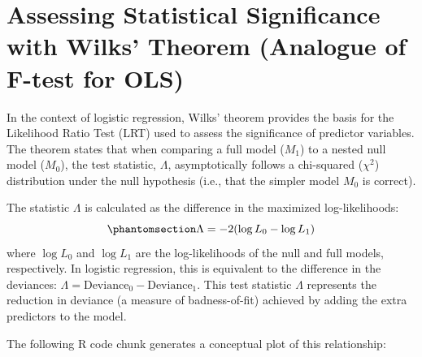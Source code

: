 \documentclass[
  letterpaper,
]{scrbook}
\begin{document}
\section{Assessing Statistical Significance with Wilks' Theorem
(Analogue of F-test for
OLS)}\label{assessing-statistical-significance-with-wilks-theorem-analogue-of-f-test-for-ols}

In the context of logistic regression, Wilks' theorem provides the basis
for the Likelihood Ratio Test (LRT) used to assess the significance of
predictor variables. The theorem states that when comparing a full model
(\(M_1\)) to a nested null model (\(M_0\)), the test statistic,
\(\Lambda\), asymptotically follows a chi-squared (\(\chi^2\))
distribution under the null hypothesis (i.e., that the simpler model
\(M_0\) is correct).

The statistic \(\Lambda\) is calculated as the difference in the
maximized log-likelihoods:
\begin{equation}\phantomsection\label{eq-LRT}{\Lambda = -2(\log L_0 - \log L_1)}\end{equation}
where \(\log L_0\) and \(\log L_1\) are the log-likelihoods of the null
and full models, respectively. In logistic regression, this is
equivalent to the difference in the deviances:
\(\Lambda = \text{Deviance}_0 - \text{Deviance}_1\). This test statistic
\(\Lambda\) represents the reduction in deviance (a measure of
badness-of-fit) achieved by adding the extra predictors to the model.

The following R code chunk generates a conceptual plot of this
relationship:
\end{document}

